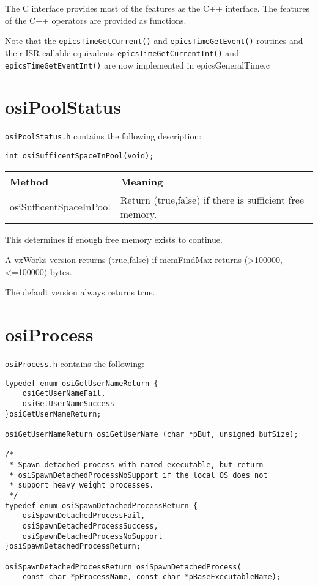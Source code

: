 The C interface provides most of the features as the C++ interface.
The features of the C++ operators are provided as functions.

Note that the \verb|epicsTimeGetCurrent()| and \verb|epicsTimeGetEvent()| routines and their ISR-callable equivalents \verb|epicsTimeGetCurrentInt()| and \verb|epicsTimeGetEventInt()| are now implemented in epicsGeneralTime.c

\section{osiPoolStatus}

\verb|osiPoolStatus.h| contains the following description:

\begin{verbatim}
int osiSufficentSpaceInPool(void);
\end{verbatim}

\begin{center}
\begin{longtable}{p{1.52778in}p{3.40278in}}
\textbf{Method} & \textbf{Meaning}\\
\hline
osiSufficentSpaceInPool & Return (true,false) if there is sufficient free memory.
\end{longtable}

\end{center}


This determines if enough free memory exists to continue.

A vxWorks version returns (true,false) if memFindMax returns (\textgreater{}100000, \textless{}=100000) bytes.

The default version always returns true.

\section{osiProcess}

\verb|osiProcess.h| contains the following:

\begin{verbatim}
typedef enum osiGetUserNameReturn {
    osiGetUserNameFail,
    osiGetUserNameSuccess
}osiGetUserNameReturn;

osiGetUserNameReturn osiGetUserName (char *pBuf, unsigned bufSize);

/*
 * Spawn detached process with named executable, but return
 * osiSpawnDetachedProcessNoSupport if the local OS does not
 * support heavy weight processes.
 */
typedef enum osiSpawnDetachedProcessReturn {
    osiSpawnDetachedProcessFail,
    osiSpawnDetachedProcessSuccess,
    osiSpawnDetachedProcessNoSupport
}osiSpawnDetachedProcessReturn;

osiSpawnDetachedProcessReturn osiSpawnDetachedProcess(
    const char *pProcessName, const char *pBaseExecutableName);

\end{verbatim}

